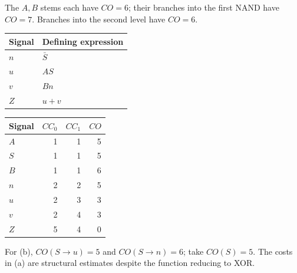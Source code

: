 \documentclass[11pt]{article}
\begin{document}
The $A,B$ stems each have $CO=6$; their branches into the first NAND
have $CO=7$. Branches into the second level have $CO=6$.
\begin{center}\begin{tabular}{ll}\toprule Signal & Defining expression\\\midrule
$n$ & $\bar S$\\
$u$ & $AS$\\
$v$ & $Bn$\\
$Z$ & $u+v$\\
\bottomrule\end{tabular}\end{center}
\begin{center}\begin{tabular}{lrrr}\toprule
Signal & $CC_0$ & $CC_1$ & $CO$\\\midrule
$A$ & 1 & 1 & 5\\
$S$ & 1 & 1 & 5\\
$B$ & 1 & 1 & 6\\
$n$ & 2 & 2 & 5\\
$u$ & 2 & 3 & 3\\
$v$ & 2 & 4 & 3\\
$Z$ & 5 & 4 & 0\\
\bottomrule\end{tabular}\end{center}

For (b), $CO(S\to u)=5$ and $CO(S\to n)=6$; take $CO(S)=5$.
The costs in (a) are structural estimates despite the function reducing to XOR.
\end{document}
